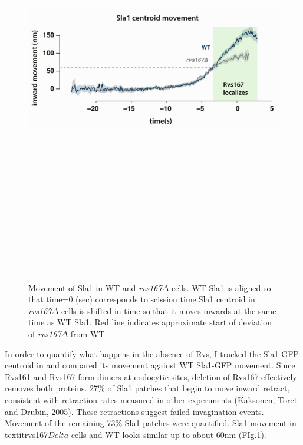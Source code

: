 	\begin{figure}[H]
		\centering
		\includegraphics[width=14cm,height=19cm, keepaspectratio, valign=t]{figures/results_final/rvsdeletion3}
		\caption[Coat movement in \textit{rvs167$\Delta$} cells]
		{Movement of Sla1 in WT and  \textit{rvs167$\Delta$} cells. WT Sla1 is aligned so that time=0 (sec) corresponds to scission time.Sla1 centroid  in \textit{rvs167$\Delta$} cells is shifted in time so that it moves inwards at the same time as WT Sla1. Red line indicates approximate start of deviation of \textit{rvs167$\Delta$} from WT. 
			\label{fig2_rvsdelta}
		}
	\end{figure}



In order to quantify what happens in the absence of Rvs, I tracked the Sla1-GFP centroid in and compared its movement against WT Sla1-GFP movement. Since Rvs161 and Rvs167 form dimers at endocytic sites, deletion of Rvs167 effectively removes both proteins. 27\% of Sla1 patches that begin to move inward retract, consistent with retraction rates measured in other experiments (Kaksonen, Toret and Drubin, 2005). These retractions suggest failed invagination events. Movement of the remaining 73\% Sla1 patches were quantified. Sla1 movement in textit{rvs167$Delta$} cells and WT looks similar up to about 60nm (FIg.\ref{fig2_rvsdelta}). 

